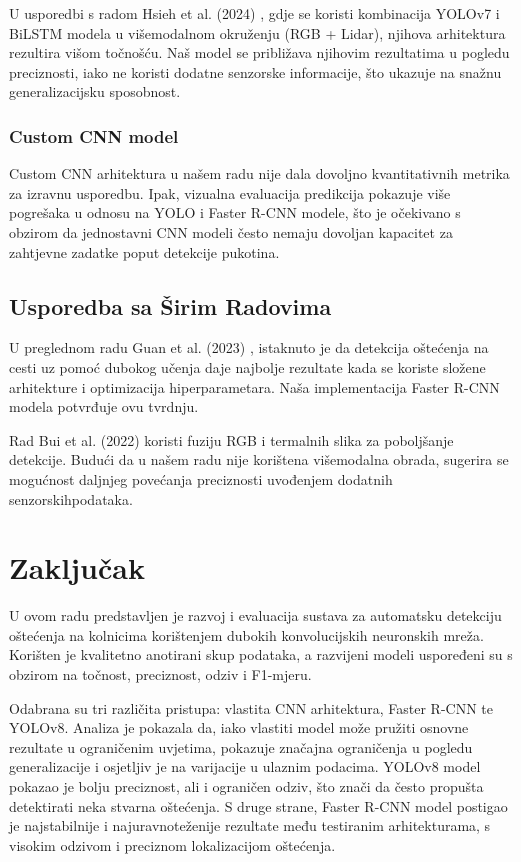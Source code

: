 \documentclass[conference]{IEEEtran}
\begin{document}
U usporedbi s radom Hsieh et al. (2024) \cite{hsieh2024}, gdje se koristi kombinacija YOLOv7 i BiLSTM modela u višemodalnom okruženju (RGB + Lidar), njihova arhitektura rezultira višom točnošću. Naš model se približava njihovim rezultatima u pogledu preciznosti, iako ne koristi dodatne senzorske informacije, što ukazuje na snažnu generalizacijsku sposobnost.

\subsubsection*{Custom CNN model}

Custom CNN arhitektura u našem radu nije dala dovoljno kvantitativnih metrika za izravnu usporedbu. Ipak, vizualna evaluacija predikcija pokazuje više pogrešaka u odnosu na YOLO i Faster R-CNN modele, što je očekivano s obzirom da jednostavni CNN modeli često nemaju dovoljan kapacitet za zahtjevne zadatke poput detekcije pukotina.

\subsection{Usporedba sa Širim Radovima}

U preglednom radu Guan et al. (2023) \cite{guan2023}, istaknuto je da detekcija oštećenja na cesti uz pomoć dubokog učenja daje najbolje rezultate kada se koriste složene arhitekture i optimizacija hiperparametara. Naša implementacija Faster R-CNN modela potvrđuje ovu tvrdnju.

Rad Bui et al. (2022) \cite{mdpi2022} koristi fuziju RGB i termalnih slika za poboljšanje detekcije. Budući da u našem radu nije korištena višemodalna obrada, sugerira se mogućnost daljnjeg povećanja preciznosti uvođenjem dodatnih senzorskihpodataka.


\section{Zaključak}
\label{pog:zakljucak}

U ovom radu predstavljen je razvoj i evaluacija sustava za automatsku detekciju oštećenja na kolnicima korištenjem dubokih konvolucijskih neuronskih mreža. Korišten je kvalitetno anotirani skup podataka, a razvijeni modeli uspoređeni su s obzirom na točnost, preciznost, odziv i F1-mjeru.

Odabrana su tri različita pristupa: vlastita CNN arhitektura, Faster R-CNN te YOLOv8. Analiza je pokazala da, iako vlastiti model može pružiti osnovne rezultate u ograničenim uvjetima, pokazuje značajna ograničenja u pogledu generalizacije i osjetljiv je na varijacije u ulaznim podacima. YOLOv8 model pokazao je bolju preciznost, ali i ograničen odziv, što znači da često propušta detektirati neka stvarna oštećenja. S druge strane, Faster R-CNN model postigao je najstabilnije i najuravnoteženije rezultate među testiranim arhitekturama, s visokim odzivom i preciznom lokalizacijom oštećenja.
\end{document}
